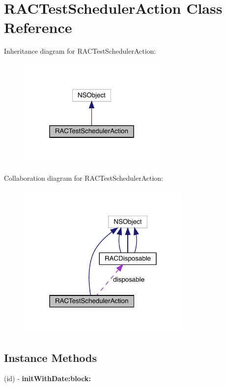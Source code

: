 \hypertarget{interface_r_a_c_test_scheduler_action}{}\section{R\+A\+C\+Test\+Scheduler\+Action Class Reference}
\label{interface_r_a_c_test_scheduler_action}


Inheritance diagram for R\+A\+C\+Test\+Scheduler\+Action\+:\nopagebreak
\begin{figure}[H]
\begin{center}
\leavevmode
\includegraphics[width=208pt]{interface_r_a_c_test_scheduler_action__inherit__graph}
\end{center}
\end{figure}


Collaboration diagram for R\+A\+C\+Test\+Scheduler\+Action\+:\nopagebreak
\begin{figure}[H]
\begin{center}
\leavevmode
\includegraphics[width=242pt]{interface_r_a_c_test_scheduler_action__coll__graph}
\end{center}
\end{figure}
\subsection*{Instance Methods}
\begin{DoxyCompactItemize}
\item 
\mbox{\label{interface_r_a_c_test_scheduler_action_ae5e5d7d9c342053f36f20d3b6ce86d91}} 
(id) -\/ {\bfseries init\+With\+Date\+:block\+:}
\end{DoxyCompactItemize}
